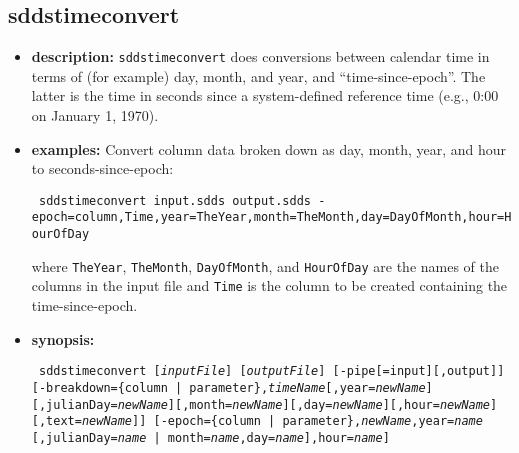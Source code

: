 \newpage 
 
\subsection{sddstimeconvert} 
\label{sddstimeconvert} 
 
\begin{itemize} 
\item {\bf description:} 
\verb|sddstimeconvert| does conversions between calendar time in 
terms of (for example) day, month, and year, and ``time-since-epoch''. 
The latter is the time in seconds since a system-defined reference 
time (e.g., 0:00 on January 1, 1970). 
 
\item {\bf examples:}  
Convert column data broken down as day, month, year, and hour to seconds-since-epoch:
\begin{flushleft}{\tt  
sddstimeconvert input.sdds output.sdds 
 -epoch=column,Time,year=TheYear,month=TheMonth,day=DayOfMonth,hour=HourOfDay
} 
\end{flushleft} 
where \verb|TheYear|, \verb|TheMonth|, \verb|DayOfMonth|, and \verb|HourOfDay|
are the names of the columns in the input file and \verb|Time| is the 
column to be created containing the time-since-epoch.

\item {\bf synopsis:}  
 
\begin{flushleft}{\tt 
sddstimeconvert [{\em inputFile}] [{\em outputFile}] [-pipe[=input][,output]] 
[-breakdown=\{column | parameter\},{\em timeName}[,year={\em newName}]
\hspace*{5mm}[,julianDay={\em newName}][,month={\em newName}][,day={\em newName}][,hour={\em newName}][,text={\em newName}]]
[-epoch=\{column | parameter\},{\em newName},year={\em name} \\ \hspace*{5mm}
[,julianDay={\em name} | month={\em name},day={\em name}],hour={\em name}]
}\end{flushleft} 
 

\end{itemize}

